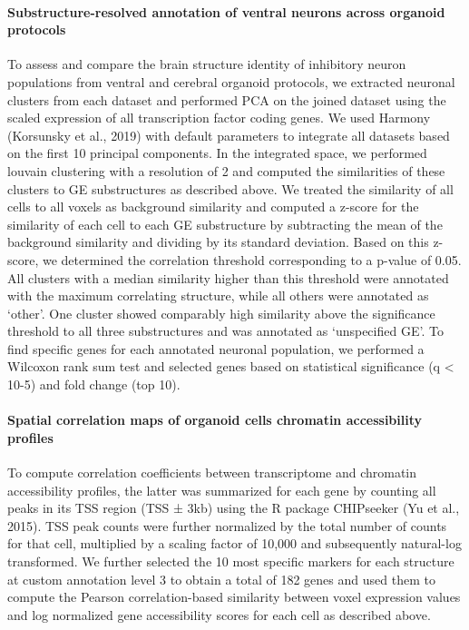 \paragraph{Substructure-resolved annotation of ventral neurons across organoid protocols}
To assess and compare the brain structure identity of inhibitory neuron populations from ventral and cerebral organoid protocols, we extracted neuronal clusters from each dataset and performed PCA on the joined dataset using the scaled expression of all transcription factor coding genes. We used Harmony (Korsunsky et al., 2019) with default parameters to integrate all datasets based on the first 10 principal components. In the integrated space, we performed louvain clustering with a resolution of 2 and computed the similarities of these clusters to GE substructures as described above. We treated the similarity of all cells to all voxels as background similarity and computed a z-score for the similarity of each cell to each GE substructure by subtracting the mean of the background similarity and dividing by its standard deviation. Based on this z-score, we determined the correlation threshold corresponding to a p-value of 0.05. All clusters with a median similarity higher than this threshold were annotated with the maximum correlating structure, while all others were annotated as ‘other’. One cluster showed comparably high similarity above the significance threshold to all three substructures and was annotated as ‘unspecified GE’. To find specific genes for each annotated neuronal population, we performed a Wilcoxon rank sum test and selected genes based on statistical significance (q < 10-5) and fold change (top 10).

\paragraph{Spatial correlation maps of organoid cells chromatin accessibility profiles}
To compute correlation coefficients between transcriptome and chromatin accessibility profiles, the latter was summarized for each gene by counting all peaks in its TSS region (TSS ± 3kb) using the R package CHIPseeker (Yu et al., 2015). TSS peak counts were further normalized by the total number of counts for that cell, multiplied by a scaling factor of 10,000 and subsequently natural-log transformed. We further selected the 10 most specific markers for each structure at custom annotation level 3 to obtain a total of 182 genes and used them to compute the Pearson correlation-based similarity between voxel expression values and log normalized gene accessibility scores for each cell as described above.

